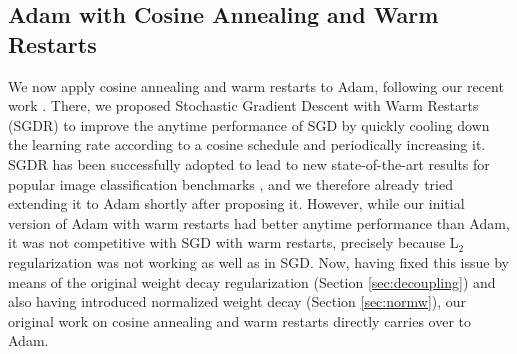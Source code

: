 \documentclass[usenames,dvipsnames]{article}
\begin{document}
\subsection{Adam with Cosine Annealing and Warm Restarts}
\label{sec:adamwr}

We now apply cosine annealing and warm restarts to Adam, following 
our recent work \citep{loshchilov2016sgdr}. There, we
proposed Stochastic Gradient Descent with Warm Restarts (SGDR) to improve the anytime performance of SGD by quickly cooling down the learning rate according to a cosine schedule and periodically increasing it. 
SGDR has been successfully adopted to lead to new state-of-the-art results for popular image classification benchmarks \citep{SnapshotICLR2017,gastaldi2017shake,zoph-arxiv17b}, and we therefore already tried extending it to Adam shortly after proposing it. 
However, while our initial version of Adam with warm restarts had better anytime performance than Adam, it was not competitive with SGD with warm restarts, precisely because L$_2$ regularization was not working as well as in SGD.
Now, having fixed this issue by means of the original weight decay regularization (Section \ref{sec:decoupling}) and also having introduced normalized weight decay (Section \ref{sec:normw}), 
our original work on cosine annealing and warm restarts
directly carries over to Adam.
\end{document}
